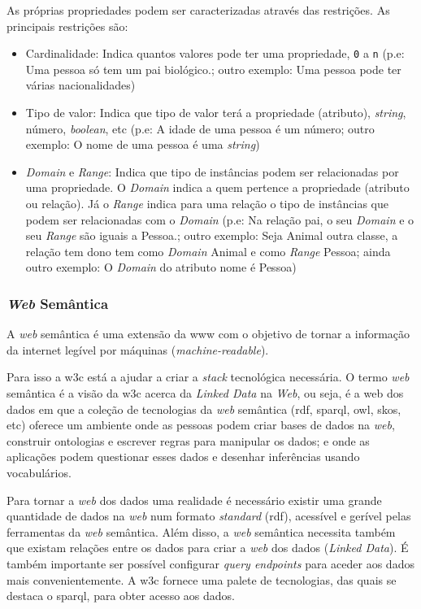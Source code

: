 As próprias propriedades podem ser caracterizadas através das restrições. As principais restrições são:
\begin{itemize}
    \item Cardinalidade: Indica quantos valores pode ter uma propriedade, \texttt{0} a \texttt{n} (p.e: Uma pessoa só tem um pai biológico.; outro exemplo: Uma pessoa pode ter várias nacionalidades)
    \item Tipo de valor: Indica que tipo de valor terá a propriedade (atributo), \textit{string}, número, \textit{boolean}, etc (p.e: A idade de uma pessoa é um número; outro exemplo: O nome de uma pessoa é uma \textit{string})
    \item \textit{Domain} e \textit{Range}: Indica que tipo de instâncias podem ser relacionadas por uma propriedade. O \textit{Domain} indica a quem pertence a propriedade (atributo ou relação). Já o \textit{Range} indica para uma relação o tipo de instâncias que podem ser relacionadas com o \textit{Domain} (p.e: Na relação pai, o seu \textit{Domain} e o seu \textit{Range} são iguais a Pessoa.; outro exemplo: Seja Animal outra classe, a relação tem dono tem como \textit{Domain} Animal e como \textit{Range} Pessoa; ainda outro exemplo: O \textit{Domain} do atributo nome é Pessoa)
\end{itemize}

\subsubsection{\textit{Web} Semântica}

A \textit{web} semântica é uma extensão da \acrshort{www} com o objetivo de tornar a informação da internet legível por máquinas (\textit{machine-readable}).

Para isso a \acrfull{w3c} está a ajudar a criar a \textit{stack} tecnológica necessária. O termo \textit{web} semântica é a visão da \acrshort{w3c} acerca da \textit{Linked Data} na \textit{Web}, ou seja, é a web dos dados em que a coleção de tecnologias da \textit{web} semântica (\acrshort{rdf}, \acrshort{sparql}, \acrshort{owl}, \acrshort{skos}, etc) oferece um ambiente onde as pessoas podem criar bases de dados na \textit{web}, construir ontologias e escrever regras para manipular os dados; e onde as aplicações podem questionar esses dados e desenhar inferências usando vocabulários.

Para tornar a \textit{web} dos dados uma realidade é necessário existir uma grande quantidade de dados na \textit{web} num formato \textit{standard} (\acrshort{rdf}), acessível e gerível pelas ferramentas da \textit{web} semântica. Além disso, a \textit{web} semântica necessita também que existam relações entre os dados para criar a \textit{web} dos dados (\textit{Linked Data}). É também importante ser possível configurar \textit{query endpoints} para aceder aos dados mais convenientemente. A \acrshort{w3c} fornece uma palete de tecnologias, das quais se destaca o \acrshort{sparql}, para obter acesso aos dados.

